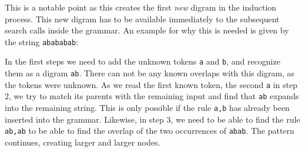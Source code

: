 This is a notable point as this creates the first \textit{new} digram in the induction process. This new digram has to be available immediately to the subsequent search calls inside the grammar. An example for why this is needed is given by the string \texttt{abababab}:\par
\begin{multicols}{2}
{
    In the first steps we need to add the unknown tokens \texttt{a} and \texttt{b}, and recognize them as a digram \texttt{ab}. There can not be any known overlaps with this digram, as the tokens were unknown. As we read the first known token, the second \texttt{a} in step $2$, we try to match its parents with the remaining input and find that \texttt{ab} expands into the remaining string. This is only possible if the rule \texttt{a,b} has already been inserted into the grammar. Likewise, in step $3$, we need to be able to find the rule \texttt{ab,ab} to be able to find the overlap of the two occurrences of \texttt{abab}. The pattern continues, creating larger and larger nodes.\par

}
\end{multicols}
